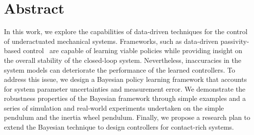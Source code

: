 
\chapter*{Abstract}

In this work, we explore the capabilities of data-driven techniques for the
control of underactuated mechanical systems. Frameworks, such as data-driven
passivity-based control~\cite{neuralpbc} are capable of learning viable policies
while providing insight on the overall stability of the closed-loop system.
Nevertheless, inaccuracies in the system models can deteriorate the performance
of the learned controllers. To address this issue, we design a Bayesian policy
learning framework that accounts for system parameter uncertainties and
measurement error. We demonstrate the robustness properties of the Bayesian
framework through simple examples and a series of simulation and real-world
experiments undertaken on the simple pendulum and the inertia wheel pendulum.
Finally, we propose a research plan to extend the Bayesian technique to design
controllers for contact-rich systems.